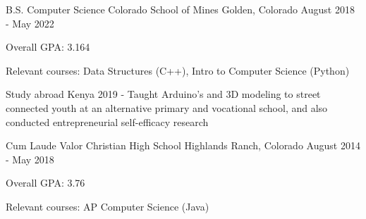 

\begin{cventries}

  \cventry
    {B.S. Computer Science}
    {Colorado School of Mines} %
    {Golden, Colorado} %
    {August 2018 - May 2022} %
    {
      \begin{cvitems} %
        \item {Overall GPA: 3.164}
        \item {Relevant courses: Data Structures (C++), Intro to Computer Science
    (Python)}
   \item {Study abroad Kenya 2019 - Taught Arduino's and 3D modeling
    to street connected youth at an alternative primary and vocational
    school, and also
    conducted entrepreneurial self-efficacy research}
      \end{cvitems}
    }
    
  \cventry
    {Cum Laude}
    {Valor Christian High School} %
    {Highlands Ranch, Colorado} %
    {August 2014 - May 2018} %
    {
      \begin{cvitems} %
        \item {Overall GPA: 3.76}
        \item {Relevant courses: AP Computer Science (Java) }
      \end{cvitems}
    }

\end{cventries}

